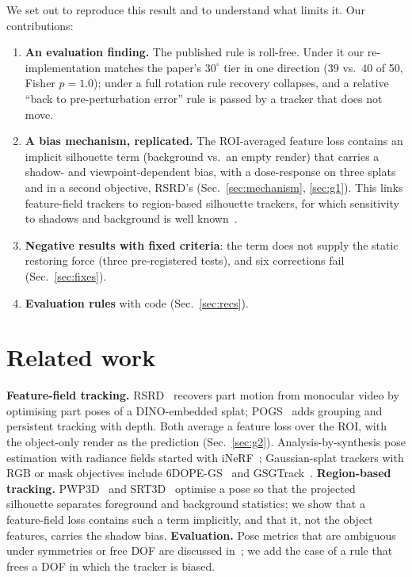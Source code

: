 \documentclass[conference]{IEEEtran}
\begin{document}
We set out to reproduce this result and to understand what limits it. Our contributions:
\begin{enumerate}
\item \textbf{An evaluation finding.} The published rule is roll-free. Under it our re-implementation matches the
paper's $30^\circ$ tier in one direction ($39$ vs.\ $40$ of 50, Fisher $p=1.0$); under a full rotation rule recovery
collapses, and a relative ``back to pre-perturbation error'' rule is passed by a tracker that does not move.
\item \textbf{A bias mechanism, replicated.} The ROI-averaged feature loss contains an implicit silhouette term
(background vs.\ an empty render) that carries a shadow- and viewpoint-dependent bias, with a dose-response on three
splats and in a second objective, RSRD's (Sec.~\ref{sec:mechanism}, \ref{sec:g1}). This links feature-field trackers to region-based silhouette trackers, for which
sensitivity to shadows and background is well known~\cite{prisacariu2012pwp3d,stoiber2022srt3d}.
\item \textbf{Negative results with fixed criteria}: the term does not supply the static restoring force
(three pre-registered tests), and six corrections fail (Sec.~\ref{sec:fixes}).
\item \textbf{Evaluation rules} with code (Sec.~\ref{sec:recs}).
\end{enumerate}

\section{Related work}
\textbf{Feature-field tracking.} RSRD~\cite{kerr2024rsrd} recovers part motion from monocular video by optimising
part poses of a DINO-embedded splat; POGS~\cite{yu2025pogs} adds grouping and persistent tracking with depth.
Both average a feature loss over the ROI, with the object-only render as the prediction (Sec.~\ref{sec:g2}).
Analysis-by-synthesis pose estimation with radiance fields started with iNeRF~\cite{yen2021inerf}; Gaussian-splat
trackers with RGB or mask objectives include 6DOPE-GS~\cite{jin20246dope} and GSGTrack~\cite{gsgtrack2024}.
\textbf{Region-based tracking.} PWP3D~\cite{prisacariu2012pwp3d} and SRT3D~\cite{stoiber2022srt3d} optimise a pose
so that the projected silhouette separates foreground and background statistics; we show that a feature-field
loss contains such a term implicitly, and that it, not the object features, carries the shadow bias. \textbf{Evaluation.} Pose metrics that are ambiguous under symmetries or
free DOF are discussed in~\cite{hodan2016evaluation}; we add the case of a rule that frees a DOF in which the
tracker is biased.
\end{document}
